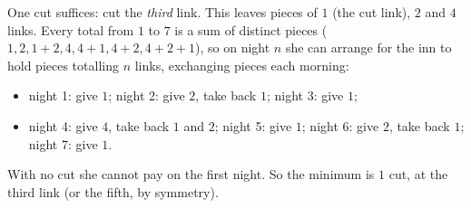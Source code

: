 One cut suffices: cut the \emph{third} link. This leaves pieces of $1$ (the cut link), $2$ and $4$ links. Every total from $1$ to $7$ is a sum of distinct pieces ($1,2,1+2,4,4+1,4+2,4+2+1$), so on night $n$ she can arrange for the inn to hold pieces totalling $n$ links, exchanging pieces each morning:
\begin{itemize}
\item night 1: give $1$; night 2: give $2$, take back $1$; night 3: give $1$;
\item night 4: give $4$, take back $1$ and $2$; night 5: give $1$; night 6: give $2$, take back $1$; night 7: give $1$.
\end{itemize}
With no cut she cannot pay on the first night. So the minimum is $\boxed{1}$ cut, at the third link (or the fifth, by symmetry).
